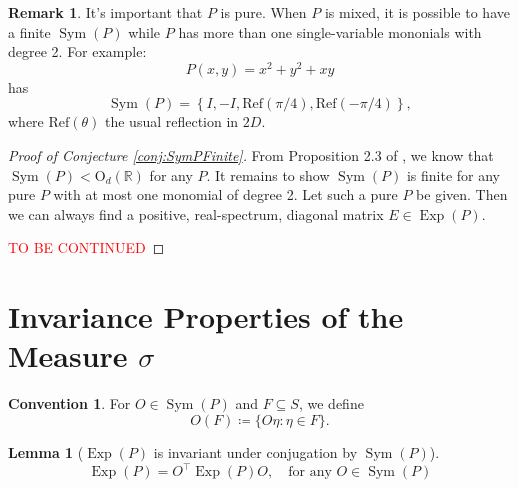 \documentclass{article}
\theoremstyle{definition}
\newcommand\OdR{\mbox{O}_d(\mathbb{R})}
\newcommand\Sym{\operatorname{Sym}}
\newcommand\Exp{\operatorname{Exp}}
\newcommand{\lc}{\left\{}
\newcommand{\rc}{\right\}}
\theoremstyle{theorem}
\newtheorem{lemma}[theorem]{Lemma}
\newtheorem{convention}[theorem]{Convention}
\newtheorem{remark}{Remark}
\begin{document}
\begin{framed}
\begin{remark}
It's important that $P$ is pure. When $P$ is mixed, it is possible to have a finite $\Sym(P)$ while $P$ has more than one single-variable mononials with degree 2. For example:
\begin{equation*}
    P(x,y) = x^2 + y^2 + xy
\end{equation*}
has 
\begin{equation*}
    \Sym(P) = \lc I, -I, \text{Ref}(\pi/4), \text{Ref}(-\pi/4)
    \rc,
\end{equation*}
where $\text{Ref}(\theta)$ the usual reflection in $2D$. 
\end{remark}



\begin{proof}[Proof of Conjecture \ref{conj:SymPFinite}]
From Proposition 2.3 of \cite{Randles2017}, we know that $\Sym(P) < \OdR{}$ for any $P$. It remains to show $\Sym(P)$ is finite for any pure $P$ with at most one monomial of degree 2. Let such a pure $P$ be given. Then we can always find a positive, real-spectrum, diagonal matrix $E\in \Exp(P)$.  

\textcolor{red}{TO BE CONTINUED}
\end{proof}





\end{framed}

\newpage









\section{Invariance Properties of the Measure $\sigma$}

\begin{convention}
For $O\in \Sym(P)$ and $F\subseteq S$, we define
\begin{equation*}
    O(F) \coloneqq \{ O \eta : \eta \in F \}.
\end{equation*}
\end{convention}








\begin{lemma}[$\Exp(P)$ is invariant under conjugation by $\Sym(P)$] \label{lem:ExpP}
\begin{equation*}
    \Exp(P) = O^\top \Exp(P) O,\quad \text{for any } O \in \Sym{(P)} 
\end{equation*}
\end{lemma}
\end{document}
